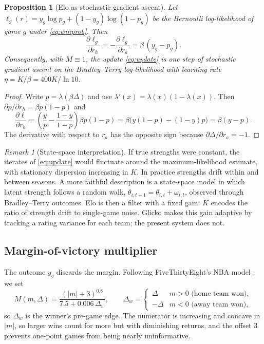 \documentclass[11pt]{article}
\theoremstyle{plain}
\newtheorem{proposition}{Proposition}
\theoremstyle{definition}
\theoremstyle{remark}
\newtheorem{remark}{Remark}
\begin{document}
\begin{proposition}[Elo as stochastic gradient ascent]\label{prop:sgd}
Let $\ell_g(r) = y_g \log p_g + (1-y_g)\log(1-p_g)$ be the Bernoulli log-likelihood of game $g$ under \eqref{eq:winprob}. Then
\[
  \frac{\partial \ell_g}{\partial r_h} = -\frac{\partial \ell_g}{\partial r_a} = \beta\,(y_g - p_g).
\]
Consequently, with $M \equiv 1$, the update \eqref{eq:update} is one step of stochastic gradient ascent on the Bradley--Terry log-likelihood with learning rate $\eta = K/\beta = 400K/\ln 10$.
\end{proposition}
\begin{proof}
Write $p = \lambda(\beta\Delta)$ and use $\lambda'(x) = \lambda(x)(1-\lambda(x))$. Then $\partial p/\partial r_h = \beta p(1-p)$ and
\[
  \frac{\partial \ell}{\partial r_h} = \left(\frac{y}{p} - \frac{1-y}{1-p}\right)\beta p (1-p) = \beta\bigl(y(1-p) - (1-y)p\bigr) = \beta (y - p).
\]
The derivative with respect to $r_a$ has the opposite sign because $\partial\Delta/\partial r_a = -1$.
\end{proof}

\begin{remark}[State-space interpretation]
If true strengths were constant, the iterates of \eqref{eq:update} would fluctuate around the maximum-likelihood estimate, with stationary dispersion increasing in $K$. In practice strengths drift within and between seasons. A more faithful description is a state-space model in which latent strength follows a random walk, $\theta_{i,t+1} = \theta_{i,t} + \omega_{i,t}$, observed through Bradley--Terry outcomes. Elo is then a filter with a fixed gain: $K$ encodes the ratio of strength drift to single-game noise. Glicko \cite{glickman1999} makes this gain adaptive by tracking a rating variance for each team; the present system does not.
\end{remark}

\subsection{Margin-of-victory multiplier}\label{sec:mov}

The outcome $y_g$ discards the margin. Following FiveThirtyEight's NBA model \cite{silver2015}, we set
\begin{equation}\label{eq:mov}
  M(m, \Delta) = \frac{(|m| + 3)^{0.8}}{7.5 + 0.006\,\Delta_w},
  \qquad
  \Delta_w = \begin{cases} \Delta & m > 0 \text{ (home team won)},\\ -\Delta & m < 0 \text{ (away team won)},\end{cases}
\end{equation}
so $\Delta_w$ is the winner's pre-game edge. The numerator is increasing and concave in $|m|$, so larger wins count for more but with diminishing returns, and the offset $3$ prevents one-point games from being nearly uninformative.
\end{document}
